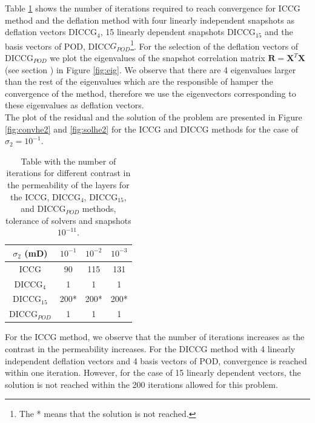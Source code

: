 \documentclass[12pt]{article}
\begin{document}
Table \ref{table:he2} shows the number of iterations required to reach convergence for ICCG method and the deflation method with four linearly independent snapshots as deflation vectors DICCG$_{4}$, 15 linearly dependent snapshots DICCG$_{15}$ and the basis vectors of POD, DICC$G_{POD}$\footnote{The * means that the solution is not reached.}. 
For the selection of the deflation vectors of DICCG$_{POD}$ we plot the eigenvalues of the snapshot correlation matrix $\mathbf{R}=\mathbf{X}^T \mathbf{X}$ (see section ) in Figure \ref{fig:eig}. We observe that there are 4 eigenvalues larger than the rest of the eigenvalues which are the responsible of hamper the convergence of the method, therefore we use the eigenvectors corresponding to these eigenvalues as deflation vectors.\\
The plot of the residual and the solution of the problem are presented in
Figure \ref{fig:convhe2} and \ref{fig:solhe2} for the ICCG and DICCG methods for the case of $\sigma_2=10^{-1}$.\\
\renewcommand{\arraystretch}{1.3}
\begin{table}[!ht]\centering
\begin{minipage}{.8\textwidth}
\vspace{-10pt}
\centering
\begin{tabular}{ |c|c|c|c|} 
\hline
 $\sigma_2$ (mD) & $10^{-1}$& $10^{-2}$ & $10^{-3}$ \\
 \hline
  ICCG  & 90& 115&131\\ 
 
  DICCG$_4$  & 1 & 1& 1\\ 
  DICCG$_{15}$  & 200* & 200*& 200*\\
  DICCG$_{POD}$  & 1 & 1& 1\\
 \hline
\end{tabular}
\caption{Table with the number of iterations for different contrast in the permeability of the layers
for the ICCG, DICCG$_4$, DICCG$_{15}$, and DICCG$_{POD}$ methods, tolerance of solvers and snapshots $10^{-11}$.}
\label{table:he2}\end{minipage}
\vspace{-10pt}
\end{table}

For the ICCG method, we observe that the number of iterations 
increases as the contrast in the permeability increases. For the DICCG method with 4 linearly independent deflation vectors and 4 basis vectors of POD, convergence is reached 
within one iteration. However, for the case of 15 linearly dependent vectors, the solution is not reached within the 200 iterations allowed for this problem.\\
\end{document}
